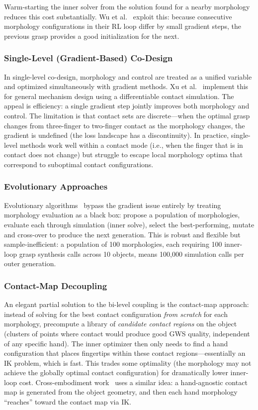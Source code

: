 \documentclass[journal]{IEEEtran}
\begin{document}
Warm-starting the inner solver from the solution found for a nearby morphology reduces
this cost substantially.
Wu et al.~\cite{wu2024evolving} exploit this: because consecutive morphology configurations
in their RL loop differ by small gradient steps, the previous grasp provides a good
initialization for the next.

\subsubsection{Single-Level (Gradient-Based) Co-Design}

In single-level co-design, morphology and control are treated as a unified variable and
optimized simultaneously with gradient methods.
Xu et al.~\cite{xu2021endtoend} implement this for general mechanism design using
a differentiable contact simulation.
The appeal is efficiency: a single gradient step jointly improves both morphology and
control.
The limitation is that contact sets are discrete---when the optimal grasp changes from
three-finger to two-finger contact as the morphology changes, the gradient is undefined
(the loss landscape has a discontinuity).
In practice, single-level methods work well within a contact mode (i.e., when the finger
that is in contact does not change) but struggle to escape local morphology optima that
correspond to suboptimal contact configurations.

\subsubsection{Evolutionary Approaches}

Evolutionary algorithms~\cite{mannam2024codesign} bypass the gradient issue entirely by
treating morphology evaluation as a black box: propose a population of morphologies,
evaluate each through simulation (inner solve), select the best-performing, mutate and
cross-over to produce the next generation.
This is robust and flexible but sample-inefficient: a population of 100 morphologies,
each requiring 100 inner-loop grasp synthesis calls across 10 objects, means 100,000
simulation calls per outer generation.

\subsubsection{Contact-Map Decoupling}

An elegant partial solution to the bi-level coupling is the contact-map approach:
instead of solving for the best contact configuration \emph{from scratch} for each
morphology, precompute a library of \emph{candidate contact regions} on the object
(clusters of points where contact would produce good GWS quality, independent of any
specific hand).
The inner optimizer then only needs to find a hand configuration that places fingertips
within these contact regions---essentially an IK problem, which is fast.
This trades some optimality (the morphology may not achieve the globally optimal
contact configuration) for dramatically lower inner-loop cost.
Cross-embodiment work~\cite{crossembodiment2025} uses a similar idea: a hand-agnostic
contact map is generated from the object geometry, and then each hand morphology
``reaches'' toward the contact map via IK.
\end{document}
